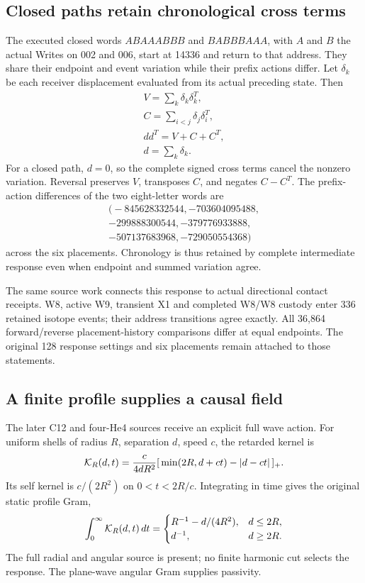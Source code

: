 \subsection{Closed paths retain chronological cross terms}

The executed closed words \(ABAAABBB\) and \(BABBBAAA\), with \(A\) and
\(B\) the actual Writes on 002 and 006, start at 14336 and return to that
address. They share their endpoint and event variation while their prefix
actions differ. Let \(\delta_k\) be each receiver displacement evaluated
from its actual preceding state. Then
\[
\begin{gathered}
V=\sum_k\delta_k\delta_k^T,\\
 C=\sum_{i<j}\delta_j\delta_i^T,\\
 dd^T=V+C+C^T,\\
 d=\sum_k\delta_k.
\end{gathered}
\]
For a closed path, \(d=0\), so the complete signed cross terms cancel the
nonzero variation. Reversal preserves \(V\), transposes \(C\), and negates
\(C-C^T\). The prefix-action differences of the two eight-letter words are
\[
 \begin{gathered}
 \bigl(-845628332544,-703604095488,\\
 -299888300544,-379776933888,\\
 -507137683968,-729050554368\bigr)
 \end{gathered}
\]
across the six placements. Chronology is thus retained by complete
intermediate response even when endpoint and summed variation agree.

The same source work connects this response to actual directional contact
receipts. W8, active W9, transient X1 and completed W8/W8 custody enter
336 retained isotope events; their address transitions agree exactly.
All 36,864 forward/reverse placement-history comparisons differ at equal
endpoints. The original 128 response settings and six placements remain
attached to those statements.

\subsection{A finite profile supplies a causal field}

The later C12 and four-He4 sources receive an explicit full wave action.
For uniform shells of radius \(R\), separation \(d\), speed \(c\), the
retarded kernel is
\[
 {\cal K}_R(d,t)=\frac{c}{4dR^2}
       [\,\min(2R,d+ct)-|d-ct|\,]_+.
\]
Its self kernel is \(c/(2R^2)\) on \(0<t<2R/c\). Integrating in time gives
the original static profile Gram,
\[
 \int_0^\infty{\cal K}_R(d,t)\,dt=
 \begin{cases}
 R^{-1}-d/(4R^2),&d\leq2R,\\
 d^{-1},&d\geq2R.
 \end{cases}
\]
The full radial and angular source is present; no finite harmonic cut
selects the response. The plane-wave angular Gram supplies passivity.

